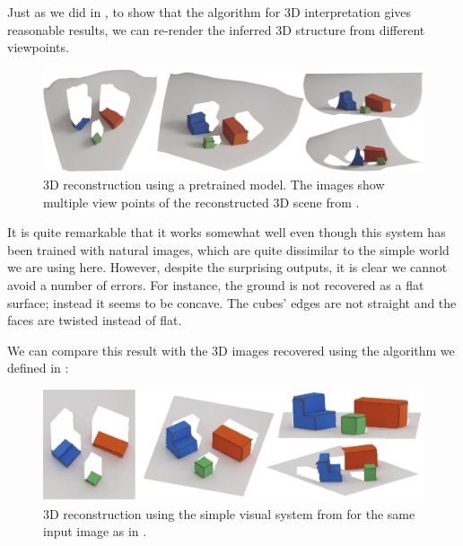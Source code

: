 Just as we did in \chap{\ref{chapter:simplesystem}}, to show that the algorithm for 3D interpretation gives reasonable results, we can re-render the inferred 3D structure from different viewpoints.
\begin{figure}
    \centerline{
        \includegraphics[width=1\linewidth]{figures/simplesystem_revisited/views_midas.jpg}
    }
    \caption{3D reconstruction using a pretrained model. The images show multiple view points of the reconstructed 3D scene from \fig{\ref{fig:simplesystem_revisited_img1}}.}
    \label{fig:views_midas}
\end{figure}

It is quite remarkable that it works somewhat well even though this system has been trained with natural images, which are quite dissimilar to the simple world we are using here. However, despite the surprising outputs, it is clear we cannot avoid a number of errors. For instance, the ground is not recovered as a flat surface; instead it seems to be concave. The cubes' edges are not straight and the faces are twisted instead of flat.

We can compare this result with the 3D images recovered using the algorithm we defined in \chap{\ref{chapter:simplesystem}}:
\begin{figure}
    \centerline{
        \includegraphics[width=1\linewidth]{figures/simplesystem/views.pdf}
    }
    \caption{3D reconstruction using the simple visual system from \chap{\ref{chapter:simplesystem}} for the same input image as in \fig{\ref{fig:views_midas}}.}
\end{figure}


